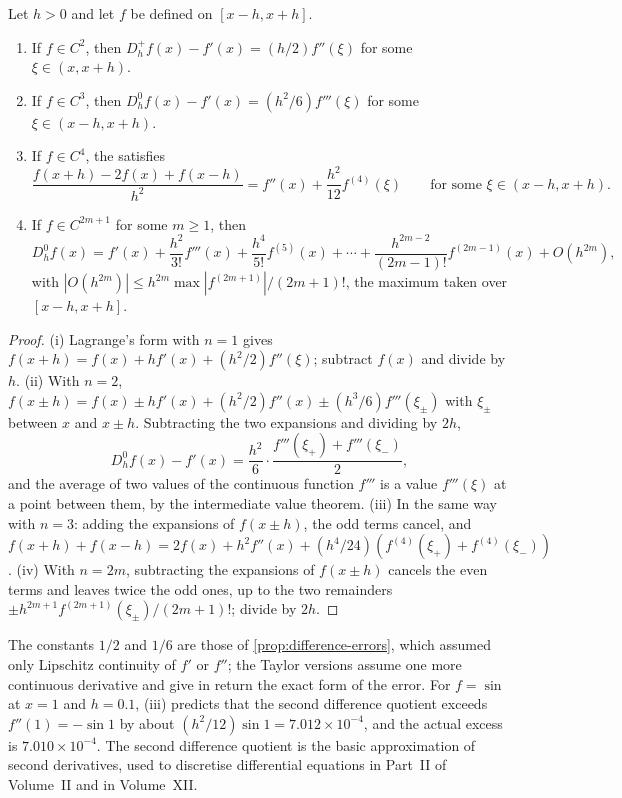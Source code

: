 \begin{proposition}
\label{prop:difference-taylor}
Let $h>0$ and let $f$ be defined on $[x-h,x+h]$.
\begin{enumerate}
\item If $f\in C^2$, then $D_h^+f(x)-f'(x)=(h/2)f''(\xi)$ for some $\xi\in(x,x+h)$.
\item If $f\in C^3$, then $D_h^0f(x)-f'(x)=(h^2/6)f'''(\xi)$ for some $\xi\in(x-h,x+h)$.
\item If $f\in C^4$, the  satisfies
\[
\frac{f(x+h)-2f(x)+f(x-h)}{h^2}=f''(x)+\frac{h^2}{12}f^{(4)}(\xi)\qquad\text{for some }\xi\in(x-h,x+h).
\]
\item If $f\in C^{2m+1}$ for some $m\ge1$, then
\[
D_h^0f(x)=f'(x)+\frac{h^2}{3!}f'''(x)+\frac{h^4}{5!}f^{(5)}(x)+\cdots+\frac{h^{2m-2}}{(2m-1)!}f^{(2m-1)}(x)+O(h^{2m}),
\]
with $|O(h^{2m})|\le h^{2m}\max|f^{(2m+1)}|/(2m+1)!$, the maximum taken over $[x-h,x+h]$.
\end{enumerate}
\end{proposition}

\begin{proof}
(i) Lagrange's form with $n=1$ gives $f(x+h)=f(x)+hf'(x)+(h^2/2)f''(\xi)$; subtract $f(x)$ and divide by $h$. (ii) With $n=2$, $f(x\pm h)=f(x)\pm hf'(x)+(h^2/2)f''(x)\pm(h^3/6)f'''(\xi_\pm)$ with $\xi_\pm$ between $x$ and $x\pm h$. Subtracting the two expansions and dividing by $2h$,
\[
D_h^0f(x)-f'(x)=\frac{h^2}6\cdot\frac{f'''(\xi_+)+f'''(\xi_-)}2 ,
\]
and the average of two values of the continuous function $f'''$ is a value $f'''(\xi)$ at a point between them, by the intermediate value theorem. (iii) In the same way with $n=3$: adding the expansions of $f(x\pm h)$, the odd terms cancel, and $f(x+h)+f(x-h)=2f(x)+h^2f''(x)+(h^4/24)(f^{(4)}(\xi_+)+f^{(4)}(\xi_-))$. (iv) With $n=2m$, subtracting the expansions of $f(x\pm h)$ cancels the even terms and leaves twice the odd ones, up to the two remainders $\pm h^{2m+1}f^{(2m+1)}(\xi_\pm)/(2m+1)!$; divide by $2h$.
\end{proof}

The constants $1/2$ and $1/6$ are those of \cref{prop:difference-errors}, which assumed only Lipschitz continuity of $f'$ or $f''$; the Taylor versions assume one more continuous derivative and give in return the exact form of the error. For $f=\sin$ at $x=1$ and $h=0.1$, (iii) predicts that the second difference quotient exceeds $f''(1)=-\sin1$ by about $(h^2/12)\sin1=7.012\times10^{-4}$, and the actual excess is $7.010\times10^{-4}$. The second difference quotient is the basic approximation of second derivatives, used to discretise differential equations in Part~II of Volume~II and in Volume~XII.

